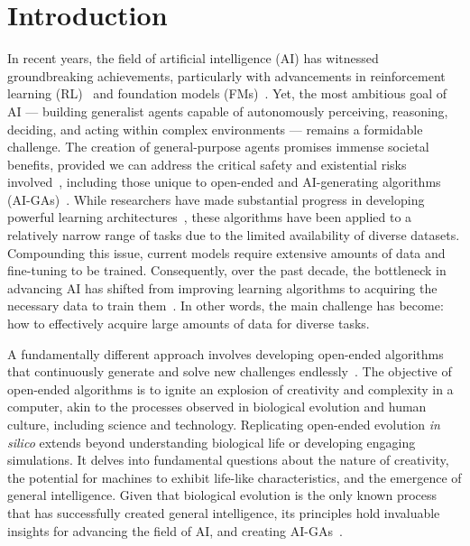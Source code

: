 \documentclass{article} %
\begin{document}
\section{Introduction}
\label{sec:introduction}
\vspace{-4pt}
In recent years, the field of artificial intelligence (AI) has witnessed groundbreaking achievements, particularly with advancements in reinforcement learning (RL)~\citep{openai_SolvingRubikCube_2019, silver_MasteringGameGo_2016, colas2019curious} and foundation models (FMs)~\citep{brown_LanguageModelsAre_2020,radford2019language}.
Yet, the most ambitious goal of AI --- building generalist agents capable of autonomously perceiving, reasoning, deciding, and acting within complex environments --- remains a formidable challenge. The creation of general-purpose agents promises immense societal benefits, provided we can address the critical safety and existential risks involved~\citep{bengio_ManagingAIRisks_2023}, including those unique to open-ended and AI-generating algorithms (AI-GAs)~\citep{clune_AIGAsAIgeneratingAlgorithms_2020, ecoffet_OpenQuestionsCreating_2020}.
While researchers have made substantial progress in developing powerful learning architectures~\citep{hafner_MasteringDiverseDomains_2024, jaegle_PerceiverIOGeneral_2022, vaswani_AttentionAllYou_2017}, these algorithms have been applied to a relatively narrow range of tasks due to the limited availability of diverse datasets. Compounding this issue, current models require extensive amounts of data and fine-tuning to be trained. Consequently, over the past decade, the bottleneck in advancing AI has shifted from improving learning algorithms to acquiring the necessary data to train them~\citep{jiang_GeneralIntelligenceRequires_2022}. In other words, the main challenge has become: how to effectively acquire large amounts of data for diverse tasks.

A fundamentally different approach involves developing open-ended algorithms that continuously generate and solve new challenges endlessly~\citep{stanley2017open}. The objective of open-ended algorithms is to ignite an explosion of creativity and complexity in a computer, akin to the processes observed in biological evolution and human culture, including science and technology. Replicating open-ended evolution \emph{in silico} extends beyond understanding biological life or developing engaging simulations. It delves into fundamental questions about the nature of creativity, the potential for machines to exhibit life-like characteristics, and the emergence of general intelligence. Given that biological evolution is the only known process that has successfully created general intelligence, its principles hold invaluable insights for advancing the field of AI, and creating AI-GAs~\citep{clune_AIGAsAIgeneratingAlgorithms_2020}.
\end{document}

